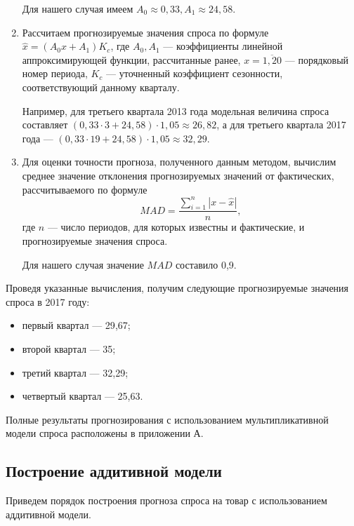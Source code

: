 \begin{enumerate}
  Для нашего случая имеем \( A_0 \approx 0{,}33, A_1 \approx 24{,}58 \).

\item Рассчитаем прогнозируемые значения спроса по формуле
  \( \hat{x} = (A_0 x + A_1) K_c \), где
  \( A_0, A_1 \) --- коэффициенты линейной аппроксимирующей функции,
  рассчитанные ранее,
  \( x = \overline{1,20} \) --- порядковый номер периода,
  \( K_c \) --- уточненный коэффициент сезонности, соответствующий
  данному кварталу.

  Например, для третьего квартала 2013 года модельная величина спроса
  составляет
  \( ( 0{,}33 \cdot 3 + 24{,}58 ) \cdot 1{,}05 \approx 26{,}82 \),
  а для третьего квартала 2017 года ---
  \( ( 0{,}33 \cdot 19 + 24{,}58 ) \cdot 1{,}05 \approx 32{,}29 \).

\item Для оценки точности прогноза, полученного данным методом, вычислим
  среднее значение отклонения прогнозируемых значений от фактических,
  рассчитываемого по формуле
  \begin{equation}
    \label{eq:mad}
    MAD = \dfrac{\sum^n_{i = 1} |x - \hat{x}|}{n},
  \end{equation}
  \hspace{1.5mm} где \( n \) --- число периодов,
  для которых известны и фактические, и прогнозируемые значения спроса.

  Для нашего случая значение \( MAD \) составило 0{,}9.
\end{enumerate}

Проведя указанные вычисления, получим следующие прогнозируемые значения
спроса в 2017 году:

\begin{itemize}
\item первый квартал --- 29{,}67;
\item второй квартал --- 35;
\item третий квартал --- 32{,}29;
\item четвертый квартал --- 25{,}63.
\end{itemize}

Полные результаты прогнозирования с использованием мультипликативной
модели спроса расположены в приложении А.


\subsection{Построение аддитивной модели}

Приведем порядок построения прогноза спроса на товар с использованием
аддитивной модели.


